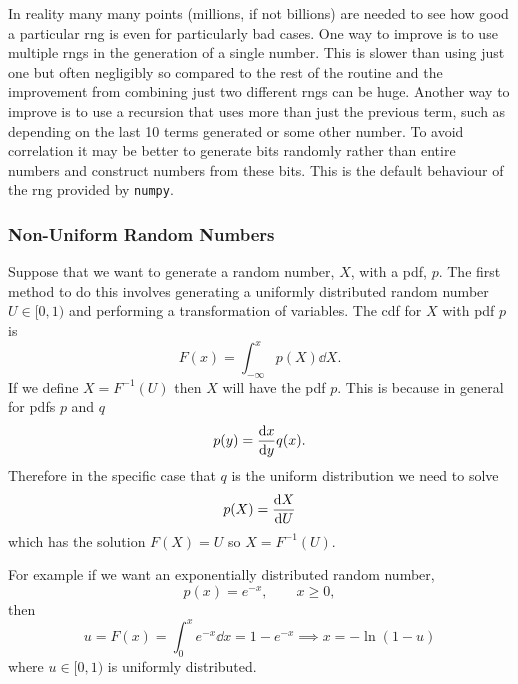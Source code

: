 \documentclass[a4paper]{article}
\begin{document}
    In reality many many points (millions, if not billions) are needed to see how good a particular \gls{rng} is even for particularly bad cases.
    One way to improve is to use multiple \glspl{rng} in the generation of a single number.
    This is slower than using just one but often negligibly so compared to the rest of the routine and the improvement from combining just two different \glspl{rng} can be huge.
    Another way to improve is to use a recursion that uses more than just the previous term, such as depending on the last 10 terms generated or some other number.
    To avoid correlation it may be better to generate bits randomly rather than entire numbers and construct numbers from these bits.
    This is the default behaviour of the \gls{rng} provided by \lstinline|numpy|.
    
    \subsubsection{Non-Uniform Random Numbers}\label{sec:non-uniform random numbers}
    Suppose that we want to generate a random number, \(X\), with a \gls{pdf}, \(p\).
    The first method to do this involves generating a uniformly distributed random number \(U\in[0, 1)\) and performing a transformation of variables.
    The \gls{cdf} for \(X\) with \gls{pdf} \(p\) is
    \[F(x) = \int_{-\infty}^{x} p(X)\dd{X}.\]
    If we define \(X = F^{-1}(U)\) then \(X\) will have the \gls{pdf} \(p\).
    This is because in general for \glspl{pdf} \(p\) and \(q\)
    \[p(y) = \dv{x}{y}q(x).\]
    Therefore in the specific case that \(q\) is the uniform distribution we need to solve
    \[p(X) = \dv{X}{U}\]
    which has the solution \(F(X) = U\) so \(X = F^{-1}(U)\).
    
    For example if we want an exponentially distributed random number,
    \[p(x) = e^{-x},\qquad x\ge 0,\]
    then
    \[u = F(x) = \int_0^x e^{-x}\dd{x} = 1 - e^{-x} \implies x = -\ln(1 - u)\]
    where \(u\in[0, 1)\) is uniformly distributed.
    
\end{document}
